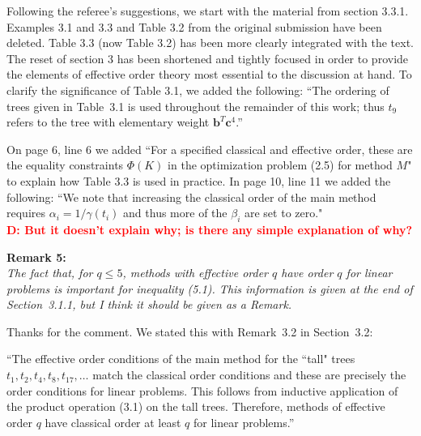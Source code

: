 \documentclass[12pt]{article}
\newcommand{\remark}[2]{\vspace{25pt} \noindent \textbf{Remark #1:\newline} \textit{#2}\vspace{15pt}}
\renewcommand{\newline}{\vspace{15pt}\\}
\newcommand{\david}[1]{\textcolor{red}{\\\textbf{D: \footnotesize #1}\\}}
\begin{document}
Following the referee's suggestions, we start with the material from section 3.3.1.
Examples 3.1 and 3.3 and Table 3.2 from the original submission have been deleted.
Table 3.3 (now Table 3.2) has been more clearly integrated with the text.
The reset of section 3 has been shortened and tightly focused in order to provide the elements
of effective order theory most essential to the discussion at hand.
To clarify the significance of Table 3.1, we added the following:
``The ordering of trees given in Table~3.1 is used
throughout the remainder of this work; thus $t_9$ refers to the tree with
elementary weight $\bm{b}^T \bm{c}^4$.''

On page 6, line 6 we added
``For a specified classical and effective order, these are the equality constraints
$\Phi(K)$ in the optimization problem (2.5) for method $M$"
to explain how Table 3.3 is used in practice.
In page 10, line 11 we added the following:
``We note that increasing the classical order of the main method requires 
$\alpha_i = 1/\gamma(t_i)$ and thus more of the $\beta_i$ are set to zero."
\david{But it doesn't explain why; is there any simple explanation of why?}

\pagebreak

\remark{5}{
The fact that, for $q \leq 5$, methods with effective order $q$ have order $q$ 
for linear problems is important for inequality (5.1). 
This information is given at the end of Section~3.1.1, but I think it should be given as a Remark.}

Thanks for the comment. We stated this with Remark~3.2 in Section~3.2:

``The effective order conditions of the main method for the ``tall" trees 
$t_1, t_2, t_4, t_8, t_{17}, \dots$ match the classical order conditions
and these are precisely the order conditions for linear problems.
This follows from inductive application of the product operation (3.1)
on the tall trees. 
Therefore, methods of effective order $q$ have classical order at least $q$ 
for linear problems.''
\end{document}
